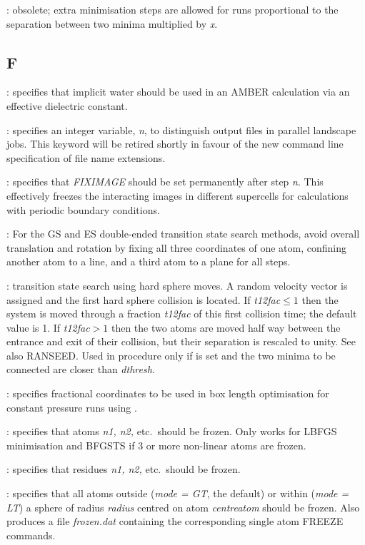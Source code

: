 {{: obsolete; extra minimisation steps are allowed
for  runs proportional to the separation between two minima
multiplied by {\it x\/}.

\subsection{F}
: specifies that implicit water should be used in an AMBER
calculation via an effective dielectric constant.
 
: specifies an integer variable, {\it n}, to distinguish output files in
parallel landscape jobs. This keyword will be retired shortly in favour of the new
command line specification of file name extensions.

: specifies that {\it FIXIMAGE\/} should be set permanently after step      
      {\it n\/}. This effectively freezes the interacting images in different supercells
      for calculations with periodic boundary conditions.

: For the GS and ES double-ended transition state search
  methods, avoid overall translation and rotation by fixing all three
  coordinates of one atom, confining another atom to a line, and a third atom
  to a plane for all steps.

: transition state search using hard sphere moves. A random
velocity vector is assigned and the first hard sphere collision is located. If {\it t12fac\/}$\le1$
then the system is moved through a fraction {\it t12fac\/} of this first collision time; the
default value is 1. If 
{\it t12fac\/}$>1$ then the two atoms are moved half way between the entrance and exit of their
collision, but their separation is rescaled to unity. See also RANSEED.
Used in  procedure only if {} is set and the two
minima to be connected are closer than {\it dthresh}.

: specifies fractional coordinates to be used in box length
      optimisation for constant pressure runs using {}.

: specifies that atoms {\it n1, n2,\/} etc.~should be frozen.
Only works for LBFGS minimisation and BFGSTS if 3 or more non-linear atoms are frozen.

: specifies that residues {\it n1, n2,\/} etc.~should be frozen.

: specifies that all atoms outside ({\it mode = GT\/}, the default) 
or within ({\it mode = LT\/}) a sphere of radius {\it radius\/} centred on atom {\it centreatom\/} should be frozen.
Also produces a file {\it frozen.dat\/} containing the corresponding single atom FREEZE commands. 

}}
